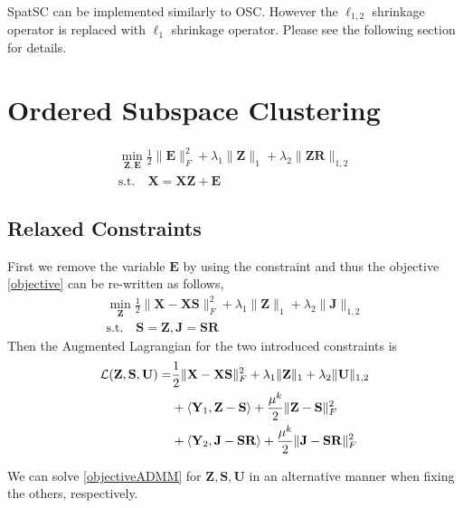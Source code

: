 \documentclass{article}
\begin{document}
SpatSC can be implemented similarly to OSC. However the $\ell_{1,2}$ shrinkage operator is replaced with $\ell_1$ shrinkage operator. Please see the following section for details.

\newpage
\section{Ordered Subspace Clustering}

\begin{align}
\label{objective}
\min_{\mathbf Z, \mathbf E} \frac12\|\mathbf E \|^2_F +\lambda_1\|\mathbf Z\|_{1}+\lambda_2\|\mathbf Z\mathbf R\|_{1,2} \\
\text{s.t.} \quad \mathbf{X = XZ + E} \nonumber
\end{align}

\subsection{Relaxed Constraints}

First we remove the variable $\mathbf E$ by using the constraint and thus the objective \eqref{objective} can be re-written as follows,
\begin{align}
\label{objective_relaxed}
\min_{\mathbf Z} \frac12\|\mathbf X - \mathbf X\mathbf S\|^2_F +\lambda_1\|\mathbf Z\|_{1}+\lambda_2\|\mathbf J \|_{1,2}\\
\text{s.t.} \quad \mathbf{S = Z, J = SR} \nonumber
\end{align}
Then the Augmented Lagrangian for the two introduced constraints is
\begin{align}
\mathcal{L}(\mathbf Z, \mathbf S, \mathbf U) = & \frac12\|\mathbf X - \mathbf X\mathbf S\|^2_F + \lambda_1 \|\mathbf Z\|_{1} + \lambda_2\|\mathbf U\|_{1,2} \notag\\
& + \langle \mathbf Y_1, \mathbf Z - \mathbf S\rangle +\frac{\mu^k}2\|\mathbf Z - \mathbf S\|^2_F \notag\\
& + \langle \mathbf Y_2, \mathbf J - \mathbf S\mathbf R\rangle +\frac{\mu^k}2\|\mathbf J - \mathbf S\mathbf R\|^2_F
\label{objectiveADMM}
\end{align}

We can solve \eqref{objectiveADMM} for $\mathbf Z, \mathbf S, \mathbf U$ in an alternative manner when fixing the others, respectively.
\end{document}
